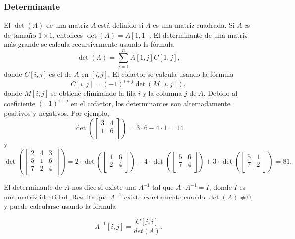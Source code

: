 \subsubsection{Determinante}


El  $\det(A)$ de una matriz $A$
está definido si $A$ es una matriz cuadrada.
Si $A$ es de tamaño $1 \times 1$,
entonces $\det(A)=A[1,1]$.
El determinante de una matriz más grande se
calcula recursivamente usando la fórmula 
\[\det(A)=\sum_{j=1}^n A[1,j] C[1,j],\]
donde $C[i,j]$ es el  de $A$
en $[i,j]$.
El cofactor se calcula usando la fórmula
\[C[i,j] = (-1)^{i+j} \det(M[i,j]),\]
donde $M[i,j]$ se obtiene eliminando
la fila $i$ y la columna $j$ de $A$.
Debido al coeficiente $(-1)^{i+j}$ en el cofactor,
los determinantes son alternadamente positivos
y negativos.
Por ejemplo,
\[
\det(
 \begin{bmatrix}
  3 & 4 \\
  1 & 6 \\
 \end{bmatrix}
) = 3 \cdot 6 - 4 \cdot 1 = 14
\]
y
\[
\det(
 \begin{bmatrix}
  2 & 4 & 3 \\
  5 & 1 & 6 \\
  7 & 2 & 4 \\
 \end{bmatrix}
) =
2 \cdot
\det(
 \begin{bmatrix}
  1 & 6 \\
  2 & 4 \\
 \end{bmatrix}
)
-4 \cdot
\det(
 \begin{bmatrix}
  5 & 6 \\
  7 & 4 \\
 \end{bmatrix}
)
+3 \cdot
\det(
 \begin{bmatrix}
  5 & 1 \\
  7 & 2 \\
 \end{bmatrix}
) = 81.
\]


El determinante de $A$ nos dice
si existe una 
$A^{-1}$ tal que $A \cdot A^{-1} = I$,
donde $I$ es una matriz identidad.
Resulta que $A^{-1}$ existe
exactamente cuando $\det(A) \neq 0$,
y puede calcularse usando la fórmula

\[A^{-1}[i,j] = \frac{C[j,i]}{det(A)}.\]

